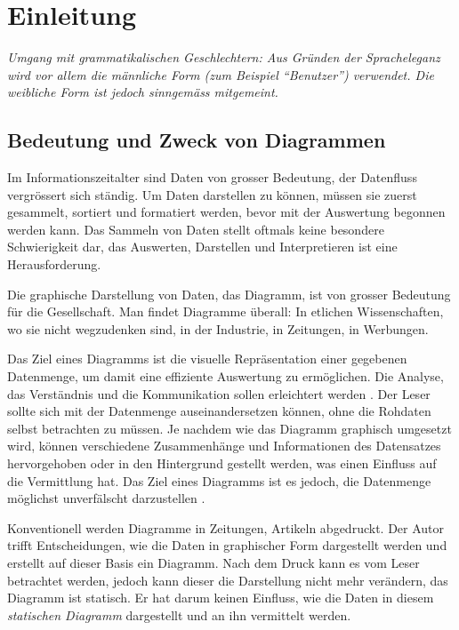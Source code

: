 \chapter{Einleitung}

\textit{Umgang mit grammatikalischen Geschlechtern: Aus Gründen der Spracheleganz wird vor allem die männliche Form (zum Beispiel "`Benutzer"') verwendet. Die weibliche Form ist jedoch sinngemäss mitgemeint.}

\section{Bedeutung  und Zweck von Diagrammen}

Im Informationszeitalter sind Daten von grosser Bedeutung, der Datenfluss vergrössert sich ständig. Um Daten darstellen zu können, müssen sie zuerst gesammelt, sortiert und formatiert werden, bevor mit der Auswertung begonnen werden kann. Das Sammeln von Daten stellt oftmals keine besondere Schwierigkeit dar, das Auswerten, Darstellen und Interpretieren ist eine Herausforderung.

Die graphische Darstellung von Daten, das Diagramm, ist von grosser Bedeutung für die Gesellschaft. Man findet Diagramme überall: In etlichen Wissenschaften, wo sie nicht wegzudenken sind, in der Industrie, in Zeitungen, in Werbungen.


Das Ziel eines Diagramms ist die visuelle Repräsentation einer gegebenen Datenmenge, um damit eine effiziente Auswertung zu ermöglichen. Die Analyse, das Verständnis und die Kommunikation sollen erleichtert werden \cite[Kapitel 1.1]{viz}. Der Leser sollte sich mit der Datenmenge auseinandersetzen können, ohne die Rohdaten selbst betrachten zu müssen. Je nachdem wie das Diagramm graphisch umgesetzt wird, können verschiedene Zusammenhänge und Informationen des Datensatzes hervorgehoben oder in den Hintergrund gestellt werden, was einen Einfluss auf die Vermittlung hat. 
Das Ziel eines Diagramms ist es jedoch, die Datenmenge möglichst unverfälscht darzustellen \cite[Kapitel 1.1]{viz}. 




Konventionell werden Diagramme in Zeitungen, Artikeln abgedruckt. Der Autor trifft Entscheidungen, wie die Daten in graphischer Form dargestellt werden und erstellt auf dieser Basis ein Diagramm. Nach dem Druck kann es vom Leser betrachtet werden, jedoch kann dieser die Darstellung nicht mehr verändern, das Diagramm ist statisch. Er hat darum keinen Einfluss, wie die Daten in diesem \textit{statischen Diagramm} dargestellt und an ihn vermittelt werden.

